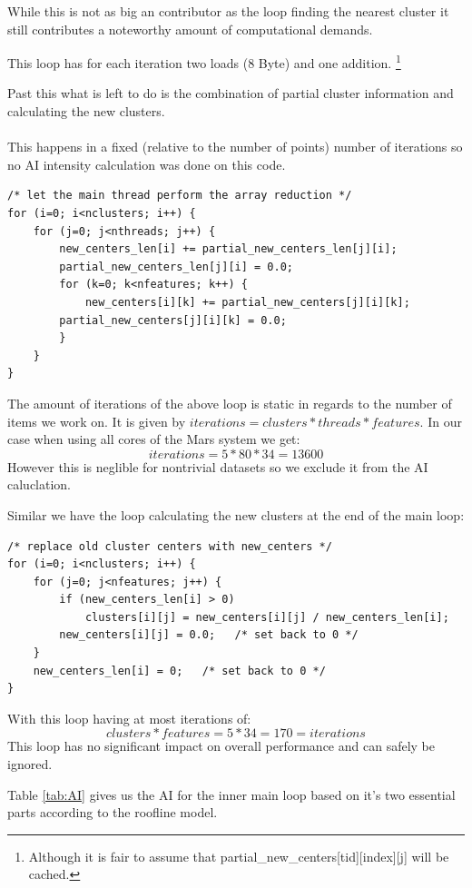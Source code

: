 While this is not as big an contributor as the loop finding the nearest cluster
it still contributes a noteworthy amount of computational demands.

This loop has for each iteration two loads (8 Byte) and one addition.
\footnote{Although it is fair to assume that partial\_new\_centers[tid][index][j] will be cached.}

Past this what is left to do is the combination of partial cluster information and calculating the new clusters.

\paragraph{} This happens in a fixed (relative to the number of points) number of iterations so no AI intensity calculation was done on this code.


\begin{lstlisting}[caption={Reduction pt1}]
/* let the main thread perform the array reduction */
for (i=0; i<nclusters; i++) {
	for (j=0; j<nthreads; j++) {
		new_centers_len[i] += partial_new_centers_len[j][i];
		partial_new_centers_len[j][i] = 0.0;
		for (k=0; k<nfeatures; k++) {
			new_centers[i][k] += partial_new_centers[j][i][k];
		partial_new_centers[j][i][k] = 0.0;
		}
	}
}
\end{lstlisting}

The amount of iterations of the above loop is static in regards to the number of items we work on.
It is given by $ iterations = clusters * threads * features$.
In our case when using all cores of the Mars system we get:
$$ iterations = 5 * 80  * 34 = 13600$$
However this is neglible for nontrivial datasets so we exclude it from the AI caluclation.

Similar we have the loop calculating the new clusters at the end of the main loop:
\begin{lstlisting}[caption={Reduction pt2}]
/* replace old cluster centers with new_centers */
for (i=0; i<nclusters; i++) {
	for (j=0; j<nfeatures; j++) {
		if (new_centers_len[i] > 0)
			clusters[i][j] = new_centers[i][j] / new_centers_len[i];
		new_centers[i][j] = 0.0;   /* set back to 0 */
	}
	new_centers_len[i] = 0;   /* set back to 0 */
}
\end{lstlisting}
With this loop having at most iterations of:
$$clusters * features = 5 * 34 = 170 = iterations$$
This loop has no significant impact on overall performance and can safely be ignored.

Table \ref{tab:AI} gives us the AI for the inner main loop based on it's two essential parts according to the roofline model.

